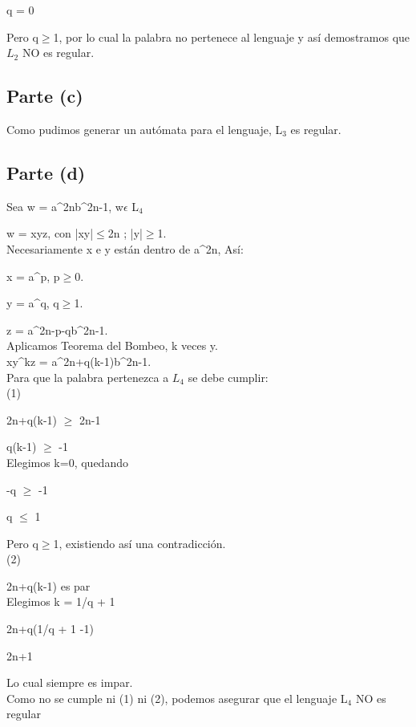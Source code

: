 \documentclass[11pt,letterpaper]{article}
\begin{document}
q = 0

Pero q$\geqslant$1, por lo cual la palabra no pertenece al lenguaje y así demostramos que $L_{2}$ NO es regular.

\subsection{Parte (c)}
Como pudimos generar un aut$ó$mata para el lenguaje, L$_{3}$ es regular.


\subsection{Parte (d)}
Sea w = a^{2n}b^{2n-1}, w$ \epsilon $ L$_{4}$

w = xyz, con |xy|$\leqslant$2n ; |y|$\geqslant$1.
 \\

Necesariamente x e y están dentro de a^{2n}, As$í$:

x = a^p, p$\geqslant$0.

y = a^q, q$\geqslant$1.

z = a^{2n-p-q}b^{2n-1}.
 \\

Aplicamos Teorema del Bombeo, k veces y.
 \\
 
xy^kz = a^{2n+q(k-1)}b^{2n-1}.
 \\

Para que la palabra pertenezca a $L_{4}$ se debe cumplir:
 \\
 
(1)

2n+q(k-1) $\geqslant$ 2n-1

q(k-1) $\geqslant$ -1
 \\
 
Elegimos k=0, quedando

-q $\geqslant$ -1

q $\leqslant$ 1

Pero q$\geqslant$1, existiendo así una contradicción.
 \\
 
(2) 

2n+q(k-1) es par
 \\
 
Elegimos k = 1/q + 1

2n+q(1/q + 1 -1)

2n+1

Lo cual siempre es impar.
 \\

Como no se cumple ni (1) ni (2), podemos asegurar que el lenguaje L$_{4}$ NO es regular
\end{document}
